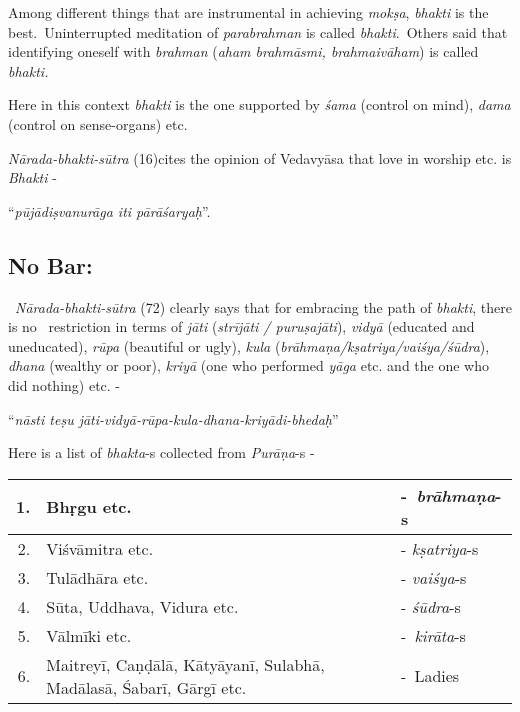 Among different things that are instrumental in achieving \textit{mokṣa}, \textit{bhakti} is the best.~Uninterrupted meditation of \textit{parabrahman} is called \textit{bhakti}.~Others said that identifying oneself with \textit{brahman} (\textit{aham brahmāsmi, brahmaivāham}) is called \textit{bhakti.}

Here in this context \textit{bhakti} is the one supported by \textit{śama} (control on mind), \textit{dama} (control on sense-organs) etc.

\textit{Nārada-bhakti-sūtra} (16)cites the opinion of Vedavyāsa that love in worship etc. is \textit{Bhakti} -

\begin{myquote}
\qquad\qquad\qquad“\textit{pūjādiṣvanurāga iti pārāśaryaḥ}”.
\end{myquote}

\vspace{-.3cm}

\subsection*{No Bar:}

\vspace{-.2cm}

 \textit{Nārada-bhakti-sūtra} (72) clearly says that for embracing the path of \textit{bhakti}, there is no  restriction in terms of \textit{jāti} (\textit{strījāti / puruṣajāti}), \textit{vidyā} (educated and uneducated), \textit{rūpa} (beautiful or ugly), \textit{kula} (\textit{brāhmaṇa/kṣatriya/vaiśya/śūdra}), \textit{dhana} (wealthy or poor), \textit{kriyā} (one who performed \textit{yāga} etc. and the one who did nothing) etc. -

\begin{myquote}
\qquad“\textit{nāsti teṣu jāti-vidyā-rūpa-kula-dhana-kriyādi-bhedaḥ}”
\end{myquote}

Here is a list of \textit{bhakta}-s collected from \textit{Purāṇa}-s -

\begin{longtable}{|r|p{6cm}|l|}
\hline
1. & Bhṛgu etc. & - \textit{brāhmaṇa}-s \\
\hline
2. & Viśvāmitra etc. & - \textit{kṣatriya}-s \\
\hline
3. & Tulādhāra etc. & - \textit{vaiśya}-s \\
\hline
4. & Sūta, Uddhava, Vidura etc. & - \textit{śūdra}-s \\
\hline
5. & Vālmīki etc. & - \textit{kirāta}-s \\
\hline
6. & Maitreyī, Caṇḍālā, Kātyāyanī, Sulabhā, Madālasā, Śabarī, Gārgī etc. & - Ladies \\
\hline
\end{longtable}

